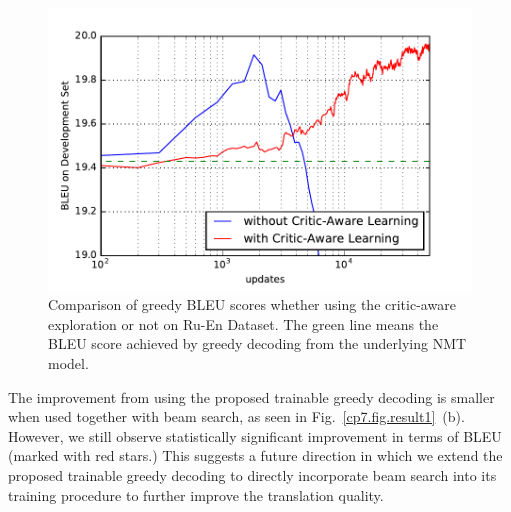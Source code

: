 \begin{figure}[htpb]
\begin{minipage}{\textwidth}
\end{minipage}
\end{figure}

\begin{figure}[htpb]
\centering
\includegraphics[width=0.8\linewidth]{figs/trainable/lr_curve.pdf}
\caption{\label{cp7.fig.lr}  
Comparison of greedy BLEU scores whether using the critic-aware exploration or not on Ru-En Dataset. The green line means the BLEU score achieved by greedy decoding from the underlying NMT model.} %
\end{figure}


The improvement from using the proposed trainable greedy decoding is smaller when used together with beam search, as seen in Fig.~\ref{cp7.fig.result1}~(b). However, we still observe statistically significant improvement in terms of BLEU (marked with red stars.) This suggests a future direction in which we extend the proposed trainable greedy decoding to directly incorporate beam search into its training procedure to further improve the translation quality. 

